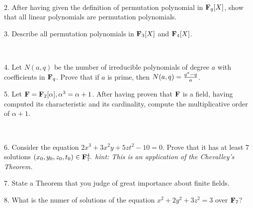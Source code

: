 \ \dotfill\ \bigskip\bigskip\bigskip


\vfil\eject


\item{2.} After having given the definition of permutation polynomial in ${\bf F}_q[X]$, show that
all linear polynomials are permutation polynomials.\vv


\item{3.} Describe all permutation polynomials in ${\bf F}_3[X]$ and ${\bf F}_4[X]$. 

\ve\ \vs


\item{4.}  Let $N(a,q)$ be the number of irreducible polynomials of degree $a$ with coefficients in ${\bf F}_q$. 
Prove that if $a$ is prime, then $N(a,q)={q^a-q\over a}$.\vv

\item{5.} Let ${\bf F}={\bf F}_2[\alpha], \alpha^3=\alpha+1$. After having proven that ${\bf F}$
is a field, having computed its characteristic and its cardinality, compute the multiplicative order of $\alpha+1$.

\ve\ \vs

\item{6.} Consider the equation $2x^3+3x^2y+5zt^2-10=0$. Prove that it has at least $7$ solutions $(x_0,y_0,z_0,t_0)\in{\bf F}_7^4.$
{\it hint: This is an application of the Chevalley's Theorem.}
\vv\vv


\item{7.}  State a Theorem that you judge of great importance about finite fields.
\vv\vv

\item{8.} What is the numer of solutions of the equation $x^2+2y^2+3z^2=3$ over ${\bf F}_7$? 

\vv



\ \vst
 \bye
